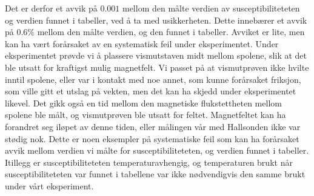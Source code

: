 \documentclass[%
 reprint,
 amsmath,amssymb,
 aps,
 norsk,
]{revtex4-1}
\begin{document}
Det er derfor et avvik på $0.001$ mellom den målte verdien av susceptibiliteteten og verdien funnet i tabeller, ved å ta med usikkerheten. Dette innebærer et avvik på $0.6\%$ mellom den målte verdien, og den funnet i tabeller. Avviket er lite, men kan ha vært forårsaket av en systematisk feil under eksperimentet. Under eksperimentet prøvde vi å plassere vismutstaven midt mellom spolene, slik at det ble utsatt for kraftigst mulig magnetfelt. Vi passet på at vismutprøven ikke hvilte inntil spolene, eller var i kontakt med noe annet, som kunne forårsaket friksjon, som ville gitt et utslag på vekten, men det kan ha skjedd under eksperimentet likevel. Det gikk også en tid mellom den magnetiske flukstettheten mellom spolene ble målt, og vismutprøven ble utsatt for feltet. Magnetfeltet kan ha forandret seg iløpet av denne tiden, eller målingen vår med Hallsonden ikke var stødig nok. Dette er noen eksempler på systematiske feil som kan ha forårsaket avvik mellom verdien vi målte for susceptibiliteteten, og verdien funnet i tabeller. Itillegg er susceptibiliteteten temperaturavhengig, og temperaturen brukt når susceptibiliteteten var funnet i tabellene var ikke nødvendigvis den samme brukt under vårt eksperiment.
\end{document}
